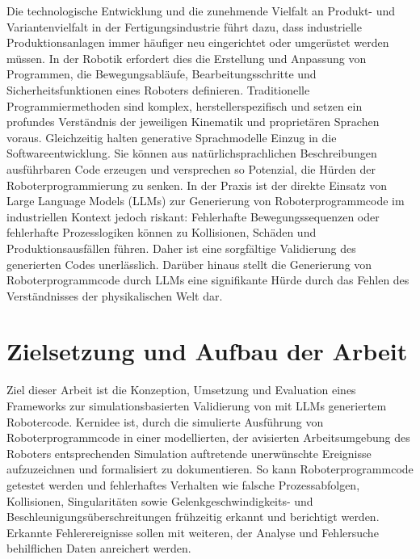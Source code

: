 Die technologische Entwicklung und die zunehmende Vielfalt
an Produkt- und Variantenvielfalt in der Fertigungsindustrie führt dazu, dass
industrielle Produktionsanlagen immer häufiger neu eingerichtet oder
umgerüstet werden müssen. In der Robotik erfordert dies die
Erstellung und Anpassung von Programmen, die Bewegungsabläufe,
Bearbeitungsschritte und Sicherheitsfunktionen eines Roboters
definieren.
Traditionelle Programmiermethoden sind komplex,
herstellerspezifisch und setzen ein profundes Verständnis der
jeweiligen Kinematik und proprietären Sprachen
voraus. Gleichzeitig halten generative
Sprachmodelle Einzug in die
Softwareentwicklung. Sie können aus natürlichsprachlichen
Beschreibungen ausführbaren Code erzeugen und versprechen so Potenzial, die
Hürden der Roboterprogrammierung zu
senken. In der Praxis ist der
direkte Einsatz von Large Language Models (LLMs) zur Generierung von
Roboterprogrammcode im industriellen Kontext jedoch riskant:
Fehlerhafte Bewegungssequenzen
oder fehlerhafte Prozesslogiken können zu Kollisionen, Schäden und
Produktionsausfällen führen. Daher ist eine
sorgfältige Validierung des
generierten Codes unerlässlich. Darüber hinaus stellt die
Generierung von Roboterprogrammcode durch LLMs eine signifikante Hürde durch das
Fehlen des Verständnisses der physikalischen Welt
dar.

\section{Zielsetzung und Aufbau der Arbeit}
\label{sec:Zielsetzung}
Ziel dieser Arbeit ist die Konzeption, Umsetzung und Evaluation eines
Frameworks zur simulationsbasierten Validierung von mit LLMs
generiertem Robotercode. Kernidee ist, durch die simulierte Ausführung von
Roboterprogrammcode in einer modellierten, der avisierten
Arbeitsumgebung des Roboters
entsprechenden Simulation auftretende unerwünschte Ereignisse
aufzuzeichnen und formalisiert zu dokumentieren. So kann Roboterprogrammcode
getestet werden und fehlerhaftes Verhalten wie falsche Prozessabfolgen,
Kollisionen, Singularitäten sowie Gelenkgeschwindigkeits- und
Beschleunigungsüberschreitungen frühzeitig erkannt und berichtigt werden.
Erkannte Fehlerereignisse sollen mit weiteren, der Analyse und Fehlersuche
behilflichen Daten anreichert werden.

